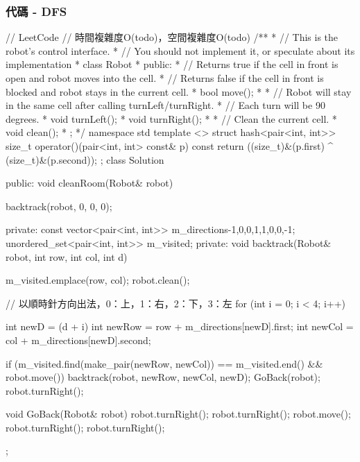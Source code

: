 \subsubsection{代碼 - DFS}
\begin{Code}
// LeetCode
// 時間複雜度O(todo)，空間複雜度O(todo)
/**
 * // This is the robot's control interface.
 * // You should not implement it, or speculate about its implementation
 * class Robot {
 *   public:
 *     // Returns true if the cell in front is open and robot moves into the cell.
 *     // Returns false if the cell in front is blocked and robot stays in the current cell.
 *     bool move();
 *
 *     // Robot will stay in the same cell after calling turnLeft/turnRight.
 *     // Each turn will be 90 degrees.
 *     void turnLeft();
 *     void turnRight();
 *
 *     // Clean the current cell.
 *     void clean();
 * };
 */
namespace std
{
    template <>
        struct hash<pair<int, int>>
        {
            size_t operator()(pair<int, int> const& p) const
            {
                return ((size_t)&(p.first) ^ (size_t)&(p.second));
            }
        };
}
class Solution {
public:
    void cleanRoom(Robot& robot) {
        
        backtrack(robot, 0, 0, 0);
    }
private:
    const vector<pair<int, int>> m_directions{{-1,0},{0,1},{1,0},{0,-1}};
    unordered_set<pair<int, int>> m_visited;
private:
    void backtrack(Robot& robot, int row, int col, int d)
    {
        m_visited.emplace(row, col);
        robot.clean();
        
        // 以順時針方向出法，0：上，1：右，2：下，3：左
        for (int i = 0; i < 4; i++)
        {
            int newD = (d + i) %
            int newRow = row + m_directions[newD].first;
            int newCol = col + m_directions[newD].second;
            
            if (m_visited.find(make_pair(newRow, newCol)) == m_visited.end() && robot.move())
            {
                backtrack(robot, newRow, newCol, newD);
                GoBack(robot);
            }
            robot.turnRight();
        }
    }
    void GoBack(Robot& robot)
    {
        robot.turnRight();
        robot.turnRight();
        robot.move();
        robot.turnRight();
        robot.turnRight();
    }
};
\end{Code}


